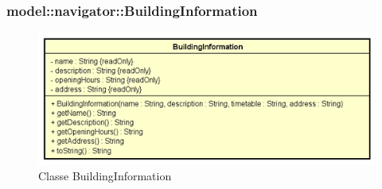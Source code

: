 \documentclass[../DefinizioneDiProdotto.tex]{subfiles}
\begin{document}
\subsubsection{model::navigator::BuildingInformation}

    \begin{figure}[H]
        \centering
        \includegraphics{img/BuildingInformation.png}
        \caption{Classe BuildingInformation}\label{fig:model::navigator::BuildingInformation} 
    \end{figure}
\end{document}
